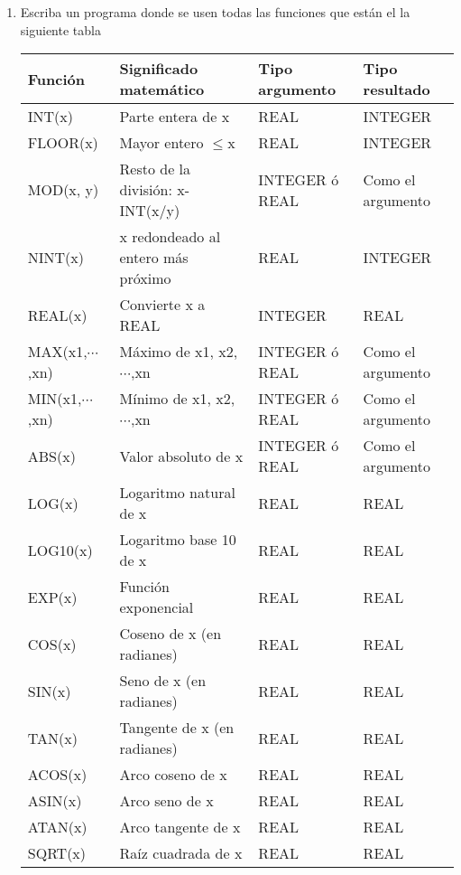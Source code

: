 \documentclass[11pt]{exam}
\begin{document}
\begin{enumerate}
 \item Escriba un programa donde se usen todas las funciones que est\'an el la siguiente tabla\\


\begin{tabular}{|p{2.5cm}|p{6.5cm}|p{3.5cm}|p{3.5cm}|}
\hline 
\textbf{Funci\'on} &         \textbf{Significado matem\'atico} &                 \textbf{Tipo argumento}& \textbf{Tipo resultado}\\ \hline 

INT(x)&           Parte entera de x &                      REAL &          INTEGER\\ \hline 
FLOOR(x)&         Mayor entero $\leq$x  &                      REAL &          INTEGER\\ \hline 
MOD(x, y)&        Resto de la divisi\'on: x-INT(x/y) &       INTEGER \'o REAL& Como el argumento\\ \hline 
NINT(x)  &        x redondeado al entero m\'as pr\'oximo&      REAL  &         INTEGER\\ \hline 
REAL(x)  &        Convierte x a REAL  &                 INTEGER&        REAL\\ \hline 
MAX(x1,$\cdots$,xn)&     M\'aximo de x1, x2, $\cdots$,xn &                  INTEGER \'o REAL& Como el argumento\\ \hline 
MIN(x1,$\cdots$,xn) &    M\'inimo de x1, x2, $\cdots$,xn &                  INTEGER \'o REAL& Como el argumento\\ \hline 
ABS(x)   &        Valor absoluto de x    &                 INTEGER \'o REAL& Como el argumento\\ \hline 
LOG(x)   &        Logaritmo natural de x &                 REAL           &REAL\\ \hline
LOG10(x)   &        Logaritmo base 10 de x &                 REAL           &REAL\\ \hline  
EXP(x)   &        Funci\'on exponencial    &                 REAL           &REAL\\ \hline 
COS(x)   &        Coseno de x (en radianes)&               REAL           &REAL\\ \hline 
SIN(x)   &        Seno de x (en radianes)   &              REAL           &REAL\\ \hline 
TAN(x)   &        Tangente de x (en radianes)&             REAL           &REAL\\ \hline 
ACOS(x)  &        Arco coseno de x           &             REAL           &REAL\\ \hline 
ASIN(x)  &        Arco seno de x             &            REAL           &REAL\\ \hline 
ATAN(x)  &        Arco tangente de x         &             REAL           &REAL\\ \hline 
SQRT(x)  &        Ra\'iz cuadrada de x &                     REAL           &REAL\\ \hline 

\end{tabular} 
\end{enumerate}
%
\end{document}
